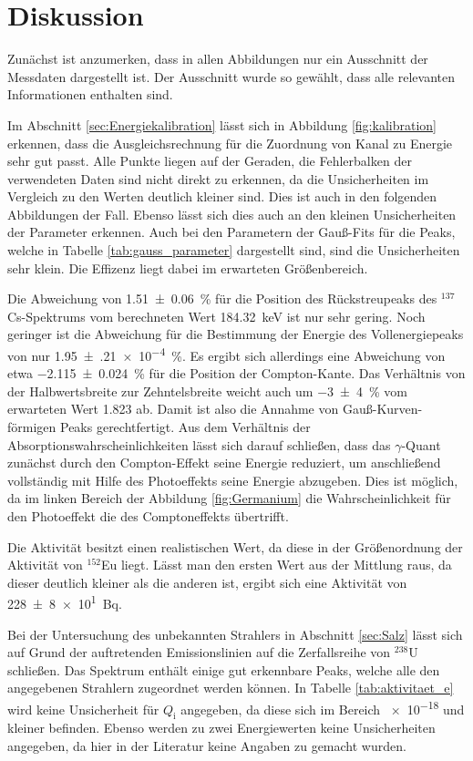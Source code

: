 \section{Diskussion}
\label{sec:Diskussion}
Zunächst ist anzumerken, dass in allen Abbildungen nur ein Ausschnitt
der Messdaten dargestellt ist. Der Ausschnitt wurde so gewählt, dass alle
relevanten Informationen enthalten sind.

Im Abschnitt \ref{sec:Energiekalibration} lässt sich in Abbildung \ref{fig:kalibration}
erkennen, dass die Ausgleichsrechnung für die Zuordnung von Kanal zu Energie
sehr gut passt. Alle Punkte liegen auf der Geraden, die Fehlerbalken der
verwendeten Daten sind nicht direkt zu erkennen, da die Unsicherheiten im Vergleich zu
den Werten deutlich kleiner sind. Dies ist auch in den folgenden Abbildungen
der Fall. Ebenso lässt sich dies auch an den kleinen Unsicherheiten der Parameter erkennen.
Auch bei den Parametern der Gauß-Fits für die Peaks, welche in Tabelle
\ref{tab:gauss_parameter} dargestellt sind, sind die Unsicherheiten sehr klein.
Die Effizenz liegt dabei im erwarteten Größenbereich.

Die Abweichung von \SI{1.51(6)}{\percent} für die
Position des Rückstreupeaks des ${}^{137}$Cs-Spektrums vom
berechneten Wert \SI{184.32}{\kilo\electronvolt} ist nur sehr gering. Noch
geringer ist die Abweichung für die Bestimmung der Energie des Vollenergiepeaks
von nur \SI{1.95(21)e-4}{\percent}. Es ergibt sich allerdings eine
Abweichung von etwa \SI{-2.115(24)}{\percent} für die Position
der Compton-Kante.
Das Verhältnis von der Halbwertsbreite zur Zehntelsbreite weicht auch 
um \SI{-3(4)}{\percent} vom erwarteten Wert \num{1.823} ab. Damit ist
also die Annahme von Gauß-Kurven-förmigen Peaks gerechtfertigt.
Aus dem Verhältnis der Absorptionswahrscheinlichkeiten lässt sich darauf schließen,
dass das $\gamma$-Quant zunächst durch den Compton-Effekt seine Energie reduziert,
um anschließend vollständig mit Hilfe des Photoeffekts seine Energie abzugeben.
Dies ist möglich, da im linken Bereich der Abbildung \ref{fig:Germanium}
die Wahrscheinlichkeit für den Photoeffekt die des Comptoneffekts
übertrifft.

Die Aktivität besitzt einen realistischen Wert, da diese in der Größenordnung der Aktivität von
${}^{152}$Eu liegt. Lässt man den ersten Wert aus der Mittlung raus, da dieser deutlich
kleiner als die anderen ist, ergibt sich eine Aktivität von \SI{228(8)e1}{\becquerel}.

Bei der Untersuchung des unbekannten Strahlers in Abschnitt \ref{sec:Salz}
lässt sich auf Grund der auftretenden Emissionslinien auf die Zerfallsreihe
von ${}^{238}$U schließen. Das Spektrum enthält einige gut erkennbare
Peaks, welche alle den angegebenen Strahlern zugeordnet werden können.
In Tabelle \ref{tab:aktivitaet_e} wird keine Unsicherheit für $Q_\text{i}$ angegeben, da diese sich im Bereich
\num{e-18} und kleiner befinden. Ebenso werden zu zwei Energiewerten keine Unsicherheiten angegeben, da
hier in der Literatur keine Angaben zu gemacht wurden.